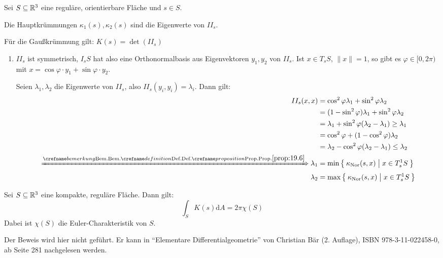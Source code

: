 \begin{satz}%
    Sei $S \subseteq \mathbb{R}^3$ eine reguläre, orientierbare Fläche und $s \in S$.
    \begin{satzenum}
        \item Die Hauptkrümmungen $\kappa_1(s), \kappa_2(s)$ sind die Eigenwerte
              von $II_s$.
        \item Für die Gaußkrümmung gilt: $K(s) = \det(II_s)$
    \end{satzenum}
\end{satz}

\begin{beweis}\leavevmode
    \begin{enumerate}[label=\alph*)]
        \item $II_s$ ist symmetrisch, $I_s S$ hat also eine Orthonormalbasis aus
              Eigenvektoren $y_1, y_2$ von $II_s$. Ist $x \in T_s S$, $\|x\| = 1$,
              so gibt es $\varphi \in [0,2\pi)$ mit $x = \cos \varphi \cdot y_1 + \sin \varphi \cdot y_2$.

              Seien $\lambda_1, \lambda_2$ die Eigenwerte von $II_s$, also 
              $II_s(y_i, y_i) = \lambda_i$. Dann gilt:
              \begin{align*}
                  II_s (x,x) &= \cos^2 \varphi \lambda_1 + \sin^2 \varphi \lambda_2\\
                  &= (1- \sin^2 \varphi) \lambda_1 + \sin^2 \varphi \lambda_2\\
                  &= \lambda_1 + \sin^2 \varphi (\lambda_2 - \lambda_1) \geq \lambda_1\\
                  &= \cos^2 \varphi + (1 - \cos^2 \varphi) \lambda_2\\
                  &= \lambda_2 - \cos^2 \varphi (\lambda_2 - \lambda_1) \leq \lambda_2\\
                  \xRightarrow{\crefabbr{prop:19.6}} \lambda_1 &= \min \Set{\kappanor (s,x) | x \in T^1_s S}\\
                  \lambda_2 &= \max \Set{\kappanor (s,x) | x \in T^1_s S}
              \end{align*}
    \end{enumerate}
\end{beweis}

\begin{satz}
    Sei $S \subseteq \mathbb{R}^3$ eine kompakte, reguläre Fläche. Dann gilt:
    \[\int_S K(s) \mathrm{d}A = 2 \pi \chi(S)\]
    Dabei ist $\chi(S)$ die Euler-Charakteristik von $S$.
\end{satz}

\begin{beweis}
    Der Beweis wird hier nicht geführt. Er kann in \enquote{Elementare Differentialgeometrie}
    von Christian Bär (2. Auflage), ISBN 978-3-11-022458-0, ab Seite 281 nachgelesen werden.
\end{beweis}